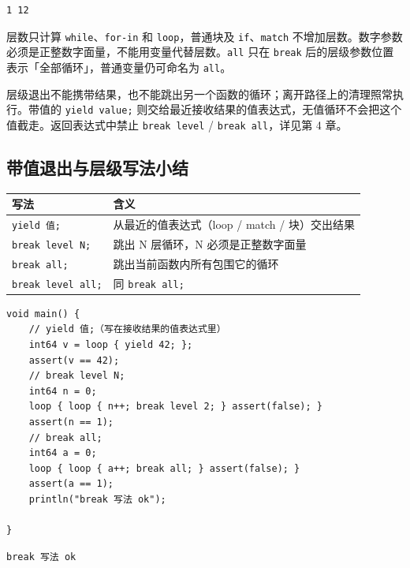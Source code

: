 \par
\medskip
\begin{lstlisting}[style=out]
1 12
\end{lstlisting}
\par
\medskip

层数只计算 \texttt{while}、\texttt{for-in} 和 \texttt{loop}，普通块及 \texttt{if}、\texttt{match} 不增加层数。数字参数必须是正整数字面量，不能用变量代替层数。\texttt{all} 只在 \texttt{break} 后的层级参数位置表示「全部循环」，普通变量仍可命名为 \texttt{all}。

层级退出不能携带结果，也不能跳出另一个函数的循环；离开路径上的清理照常执行。带值的 \texttt{yield value;} 则交给最近接收结果的值表达式，无值循环不会把这个值截走。返回表达式中禁止 \texttt{break level} / \texttt{break all}，详见第 4 章。

\subsection*{带值退出与层级写法小结}

\begin{center}
\begin{tabular}{ll}
\toprule
写法 & 含义 \\
\midrule
\texttt{yield 值;} & 从最近的值表达式（loop / match / 块）交出结果 \\
\texttt{break level N;} & 跳出 N 层循环，N 必须是正整数字面量 \\
\texttt{break all;} & 跳出当前函数内所有包围它的循环 \\
\texttt{break level all;} & 同 \texttt{break all;} \\
\bottomrule
\end{tabular}
\end{center}

\par
\medskip
\begin{lstlisting}[style=chali]
void main() {
    // yield 值;（写在接收结果的值表达式里）
    int64 v = loop { yield 42; };
    assert(v == 42);
    // break level N;
    int64 n = 0;
    loop { loop { n++; break level 2; } assert(false); }
    assert(n == 1);
    // break all;
    int64 a = 0;
    loop { loop { a++; break all; } assert(false); }
    assert(a == 1);
    println("break 写法 ok");

}
\end{lstlisting}
\par
\medskip

\par
\medskip
\begin{lstlisting}[style=out]
break 写法 ok
\end{lstlisting}
\par
\medskip

